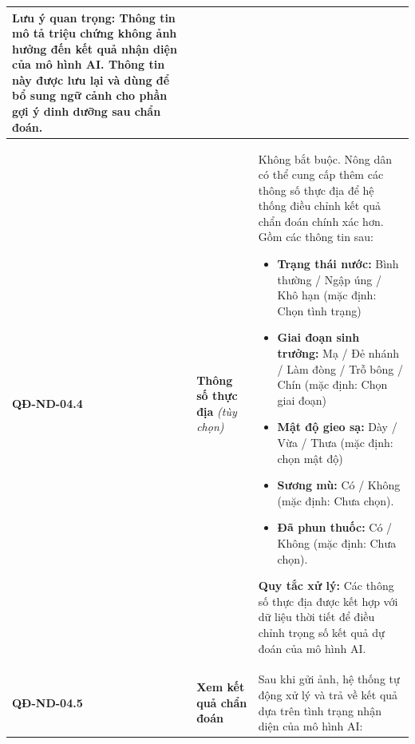 \documentclass[12pt,a4paper]{article}
\begin{document}
\begin{longtable}{|
        >{\raggedright\arraybackslash}p{2.2cm}|
        >{\raggedright\arraybackslash}p{2.8cm}|
        >{\raggedright\arraybackslash}p{9.8cm}|}
    \textbf{Lưu ý quan trọng:} Thông tin mô tả triệu chứng \textbf{không ảnh hưởng đến kết quả nhận diện của mô hình AI}. Thông tin này được lưu lại và dùng để bổ sung ngữ cảnh cho phần gợi ý dinh dưỡng sau chẩn đoán.                                                                                                                                                                \\
    \hline
    \textbf{QĐ-ND-04.4}  & \textbf{Thông số thực địa} \textit{(tùy chọn)} &
    Không bắt buộc. Nông dân có thể cung cấp thêm các thông số thực địa để hệ thống điều chỉnh kết quả chẩn đoán chính xác hơn. Gồm các thông tin sau:
    \begin{itemize}[leftmargin=*,topsep=2pt,itemsep=1pt]
        \item \textbf{Trạng thái nước:} Bình thường / Ngập úng / Khô hạn (mặc định: Chọn tình trạng)
        \item \textbf{Giai đoạn sinh trưởng:} Mạ / Đẻ nhánh / Làm đòng / Trỗ bông / Chín (mặc định: Chọn giai đoạn)
        \item \textbf{Mật độ gieo sạ:} Dày / Vừa / Thưa (mặc định: chọn mật độ)
        \item \textbf{Sương mù:} Có / Không (mặc định: Chưa chọn).
        \item \textbf{Đã phun thuốc:} Có / Không (mặc định: Chưa chọn).
    \end{itemize}
    \textbf{Quy tắc xử lý:} Các thông số thực địa được kết hợp với dữ liệu thời tiết để điều chỉnh trọng số kết quả dự đoán của mô hình AI.                                                                                                                                                                                                                                              \\
    \hline
    \textbf{QĐ-ND-04.5}  & \textbf{Xem kết quả chẩn đoán}                 &
    Sau khi gửi ảnh, hệ thống tự động xử lý và trả về kết quả dựa trên tình trạng nhận diện của mô hình AI:
    \vspace{2pt}


\end{longtable}
\end{document}
